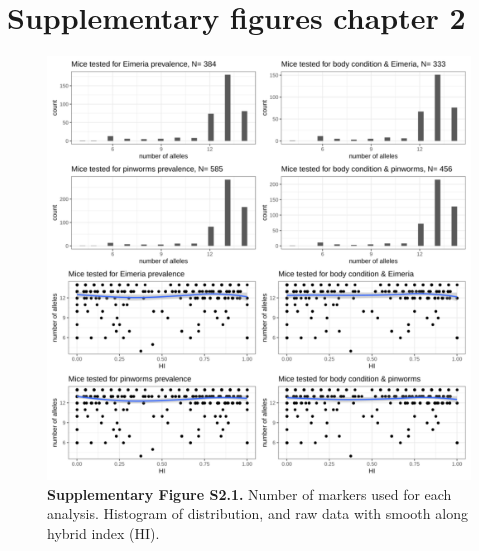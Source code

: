 \section*{Supplementary figures chapter 2}

\begin{figure}[H]
	\centering
	\includegraphics[width=\linewidth,height=\textheight,keepaspectratio]{images/2article1/SupplementaryFigureS1.pdf}
	\captionsetup{labelformat=empty}
	\caption{\textbf{Supplementary Figure S2.1.} Number of markers used for each analysis. Histogram of distribution, and raw data with smooth along hybrid index (HI).}
\end{figure}

\newpage


